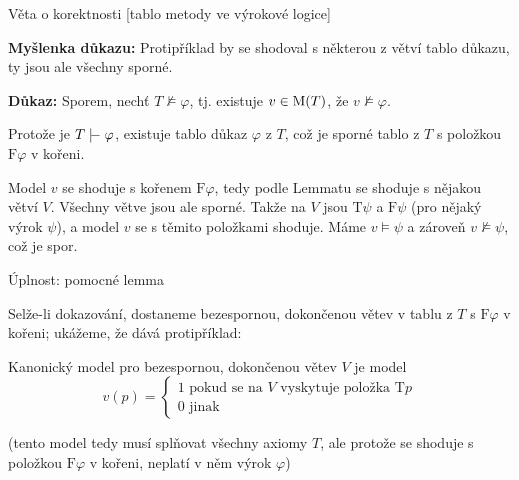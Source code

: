 \documentclass{beamer}
\begin{document}
\begin{frame}{Věta o korektnosti [tablo metody ve výrokové logice]}


    \medskip

    \pause
    \textbf{Myšlenka důkazu:} Protipříklad by se shodoval s některou z větví tablo důkazu, ty jsou ale všechny sporné.

    \medskip

    \pause
    \textbf{Důkaz:} Sporem, nechť $T\not\models\varphi$, tj. existuje $v\in\operatorname{M}(T)$, že $v\not\models\varphi$.
     
    \pause
    Protože je $T\proves\varphi$, existuje tablo důkaz $\varphi$ z $T$, což je sporné tablo z $T$ s položkou $\mathrm{F}\varphi$ v kořeni. 
    
    \pause
    Model $v$ se shoduje s kořenem $\mathrm{F}\varphi$, tedy podle Lemmatu se shoduje s nějakou větví $V$. \pause
    Všechny větve jsou ale sporné. \pause
     Takže na $V$ jsou $\mathrm{T}\psi$ a $\mathrm{F}\psi$ (pro nějaký výrok $\psi$), a model $v$ se s těmito položkami shoduje. \pause
     Máme $v\models\psi$ a zároveň $v\not\models\psi$, což je spor.\hfill\qedsymbol

\end{frame}


\begin{frame}{Úplnost: pomocné lemma}

    Selže-li dokazování, dostaneme \alert{bezespornou, dokončenou} větev v tablu z $T$ s $\mathrm{F}\varphi$ v kořeni; ukážeme, že dává protipříklad:

    \pause
    \alert{Kanonický model} pro bezespornou, dokončenou větev $V$ je model
    $$
    v(p)=\begin{cases}
        1 \text{ pokud se na $V$ vyskytuje položka $\mathrm{T}p$}\\
        0 \text{ jinak}
    \end{cases}
    $$  
    
    \medskip

    \pause

    \bigskip
    
    \pause
    (tento model tedy musí splňovat všechny axiomy $T$, ale protože se shoduje s položkou $\mathrm{F}\varphi$ v kořeni, neplatí v něm výrok $\varphi$)

\end{frame}
\end{document}
